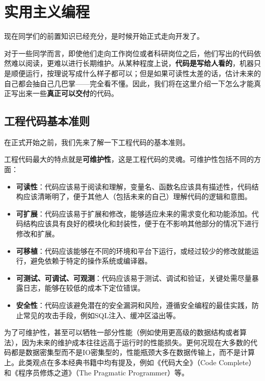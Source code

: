 \chapter{实用主义编程}

现在同学们的前置知识已经充分，是时候开始正式走向开发了。

对于一些同学而言，即使他们走向工作岗位或者科研岗位之后，他们写出的代码依然难以阅读，更难以进行长期维护。从某种程度上说，\textbf{代码是写给人看的}，机器只是顺便运行，按理说写成什么样子都可以；但是如果可读性太差的话，估计未来的自己都会抽自己几巴掌——完全看不懂。因此，我们将在这里介绍一下怎么才能真正写出来一些\textbf{真正可以交付}的代码。

\section{工程代码基本准则}

在正式开始之前，我们先来了解一下工程代码的基本准则。

工程代码最大的特点就是\textbf{可维护性}，这是工程代码的灵魂。可维护性包括不同的方面：
\begin{itemize}
  \item \textbf{可读性}：代码应该易于阅读和理解，变量名、函数名应该具有描述性，代码结构应该清晰明了，便于其他人（包括未来的自己）理解代码的逻辑和意图。
  \item \textbf{可扩展}：代码应该易于扩展和修改，能够适应未来的需求变化和功能添加。代码结构应该具有良好的模块化和封装性，便于在不影响其他部分的情况下进行修改和扩展。
  \item \textbf{可移植}：代码应该能够在不同的环境和平台下运行，或经过较少的修改就能运行，避免依赖于特定的操作系统或编译器。
  \item \textbf{可测试、可调试、可观测}：代码应该易于测试、调试和验证，关键处需尽量暴露日志，能够在较低的成本下定位错误。
  \item \textbf{安全性}：代码应该避免潜在的安全漏洞和风险，遵循安全编程的最佳实践，防止常见的攻击手段，例如SQL注入、缓冲区溢出等。
\end{itemize}
为了可维护性，甚至可以牺牲一部分性能（例如使用更高级的数据结构或者算法），因为未来的维护成本往往远高于运行时的性能损失。更何况现在大多数的代码都是数据密集型而不是IO密集型的，性能瓶颈大多在数据传输上，而不是计算上。此类观点在多本经典书籍中均有提及，例如《代码大全》（Code Complete）和《程序员修炼之道》（The Pragmatic Programmer）等。

